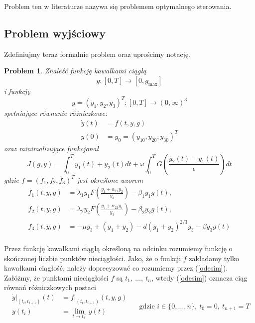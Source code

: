 \documentclass[11pt]{article}
\newtheorem{problem}{Problem}
\begin{document}
Problem ten w literaturze nazywa się problemem optymalnego sterowania.

\subsection{Problem wyjściowy}
Zdefiniujmy teraz formalnie problem oraz uprościmy notację.

\begin{problem}\label{problem}
  Znaleźć funkcję kawałkami ciągłą
  \[g: [0, T] \to [0, g_{\max}]\]
  i funkcję
  \[y = {(y_1, y_2, y_3)}^T: [0,T] \to {(0, \infty)}^3\]
  spełniające równanie różniczkowe:
  \begin{equation}\label{odesim}
    \begin{aligned}
      \dot{y}(t) &= f(t, y, g) \\
      y(0) &= y_0 = {(y_{10}, y_{20}, y_{30})}^T
    \end{aligned}
  \end{equation}
  oraz minimalizujące funkcjonał
  \begin{equation}\label{objfsim}
    J(g, y) = \int_0^T y_1(t) + y_2(t)dt + \omega\int_0^T G\left(\frac{y_2(t) - y_1(t)}{\epsilon}\right) dt
  \end{equation}
  gdzie $f = {(f_1, f_2, f_3)}^T$ jest określone wzorem
  \begin{equation}\label{dynamicsim}
    \begin{aligned}
      f_1(t, y, g) &= \lambda_1y_1F\left(\frac{y_1 + \alpha_{12}y_2}{y_3}\right) - \beta_1y_1g(t), \\
      f_2(t, y, g) &= \lambda_2y_2F\left(\frac{y_2 + \alpha_{21}y_1}{y_3}\right) - \beta_2y_2g(t), \\
      f_3(t, y, g) &= -\mu y_3 + (y_1+y_2) - d{(y_1 + y_2)}^{2/3}y_3 - \beta y_3 g(t) \\
    \end{aligned}
  \end{equation}
\end{problem}

Przez funkcję kawałkami ciągłą określoną na odcinku rozumiemy funkcję o skończonej liczbie punktów nieciągłości. Jako, że o funkcji $f$ zakładamy tylko kawałkami ciągłość, należy doprecyzować co rozumiemy przez (\ref{odesim}). Załóżmy, że punktami nieciągłości $f$ są $t_1,\ \ldots,\ t_n$, wtedy (\ref{odesim}) oznacza ciąg równań różniczkowych postaci
\begin{equation}\label{nonconode}
  \begin{aligned}
    \dot{y}|_{(t_i, t_{i+1})}(t) &= f|_{(t_i, t_{i+1})}(t, y, g)\\
    y(t_i) &= \lim_{t\to t_i^-}y(t)
  \end{aligned}
  \quad \text{ gdzie } i \in \{0,\ldots, n\},\ t_0 = 0,\ t_{n+1}=T
\end{equation}
\end{document}
